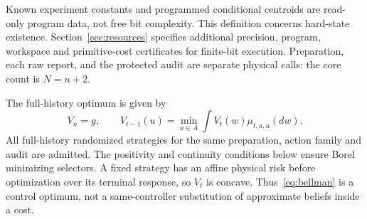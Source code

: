 Known experiment constants and programmed conditional centroids are read-only program data, not free bit complexity. This definition concerns hard-state existence. Section~\ref{sec:resources} specifies additional precision, program, workspace and primitive-cost certificates for finite-bit execution. Preparation, each raw report, and the protected audit are separate physical calls: the core count is $N=n+2$.

The full-history optimum is given by
\begin{equation}\label{eq:bellman}
 V_n=g,\qquad V_{t-1}(u)=\min_{a\in A}\int V_t(w)\mu_{t,a,u}(dw).
\end{equation}
All full-history randomized strategies for the same preparation, action family and audit are admitted. The positivity and continuity conditions below ensure Borel minimizing selectors. A fixed strategy has an affine physical risk before optimization over its terminal response, so $V_t$ is concave. Thus~\eqref{eq:bellman} is a control optimum, not a same-controller substitution of approximate beliefs inside a cost.
